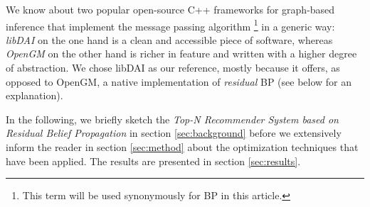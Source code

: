 We know about two popular open-source C++ frameworks for graph-based inference that implement the message passing algorithm \footnote{This term will be used synonymously for BP in this article.} in a generic way: \textit{libDAI} \cite{Mooij_libDAI_10} on the one hand is a clean and accessible piece of software, whereas \textit{OpenGM} \cite{andres2012opengm} on the other hand is richer in feature and written with a higher degree of abstraction. We chose libDAI as our reference, mostly because it offers, as opposed to OpenGM, a native implementation of \textit{residual} BP (see below for an explanation). 

In the following, we briefly sketch the \textit{Top-N Recommender System based on Residual Belief Propagation} in section \ref{sec:background} before we extensively inform the reader in section \ref{sec:method} about the optimization techniques that have been applied. The results are presented in section \ref{sec:results}.